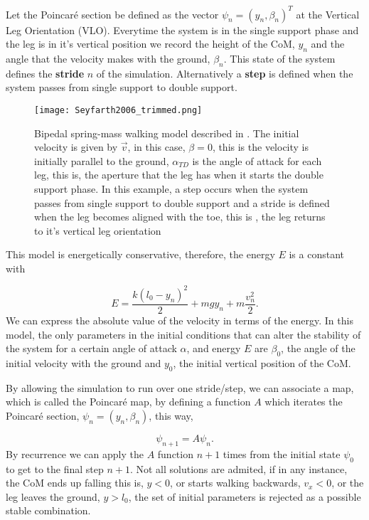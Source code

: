 Let the Poincaré section be defined as the vector $\psi_n=(y_n,\beta_n)^T$ at the Vertical Leg Orientation (VLO). Everytime the system is in the single support phase and the leg is in it's vertical position we record the height of the CoM, $y_n$ and the angle that the velocity makes with the ground, $\beta_n$. This state of the system defines the \textbf{stride} $n$ of the simulation. Alternatively a \textbf{step} is defined when the system passes from single support to double support.

\begin{figure}[H]
\centering
\texttt{[image: Seyfarth2006\_trimmed.png]}
\caption{Bipedal spring-mass walking model described in \cite{Seyfarth2006}. The initial velocity is given by $\vec{v}$, in this case, $\beta=0$, this is the velocity is initially parallel to the ground, $\alpha_{TD}$ is the angle of attack for each leg, this is, the aperture that the leg has when it starts the double support phase. In this example, a step occurs when the system passes from single support to double support and a stride is defined when the leg  becomes aligned with the toe, this is , the leg returns to it's vertical leg orientation}
\label{Seyfarthmodel}
\end{figure}


This model is energetically conservative, therefore, the energy $E$ is a constant with

\begin{equation}
  E=\frac{k (l_0-y_n)^2}{2} + m g y_n + m \frac{v_n^2}{2}.
\end{equation}
\noindent We can express the absolute value of the velocity in terms of the energy. In this model, the only parameters in the initial conditions that can alter the stability of the system for a certain angle of attack $\alpha$, and energy $E$ are $\beta_0$, the angle of the initial velocity with the ground and $y_0$, the initial vertical position of the CoM.

By allowing the simulation to run over one stride/step, we can associate a map, which is called the Poincaré map, by defining a function $A$ which iterates the Poincaré section, $\psi_n=(y_n,\beta_n)$, this way,

\begin{equation}
  \psi_{n+1}=A \psi_n.
\end{equation}
By recurrence we can apply the $A$ function $n+1$ times from the initial state $\psi_0$ to get to the final step $n+1$.
Not all solutions are admited, if in any instance, the CoM ends up falling this is, $y<0$, or starts walking backwards, $v_x<0$, or the leg leaves the ground, $y>l_0$, the set of initial parameters is rejected as a possible stable combination.







